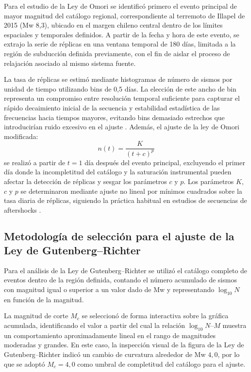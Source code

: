\documentclass[a4paper,12pt]{article} %
\numberwithin{equation}{section} %
\numberwithin{figure}{section} %
\begin{document}
Para el estudio de la Ley de Omori se identificó primero el evento principal de mayor magnitud del catálogo regional, correspondiente al terremoto de Illapel de 2015 (Mw 8{,}3), ubicado en el margen chileno central dentro de los límites espaciales y temporales definidos. A partir de la fecha y hora de este evento, se extrajo la serie de réplicas en una ventana temporal de 180 días, limitada a la región de subducción definida previamente, con el fin de aislar el proceso de relajación asociado al mismo sistema fuente.

La tasa de réplicas se estimó mediante histogramas de número de sismos por unidad de tiempo utilizando bins de 0{,}5 días. La elección de este ancho de bin representa un compromiso entre resolución temporal suficiente para capturar el rápido decaimiento inicial de la secuencia y estabilidad estadística de las frecuencias hacia tiempos mayores, evitando bins demasiado estrechos que introducirían ruido excesivo en el ajuste \cite{peng_2007,utsu_1995}. Además, el ajuste de la ley de Omori modificada:
\[
n(t) = \frac{K}{(t + c)^{p}}
\]
se realizó a partir de $t = 1$ día después del evento principal, excluyendo el primer día donde la incompletitud del catálogo y la saturación instrumental pueden afectar la detección de réplicas y sesgar los parámetros $c$ y $p$. Los parámetros $K$, $c$ y $p$ se determinaron mediante ajuste no lineal por mínimos cuadrados sobre la tasa diaria de réplicas, siguiendo la práctica habitual en estudios de secuencias de aftershocks \cite{utsu_1995,peng_2007}.

\subsection{Metodología de selección para el ajuste de la Ley de Gutenberg--Richter}

Para el análisis de la Ley de Gutenberg--Richter se utilizó el catálogo completo de eventos dentro de la región definida, contando el número acumulado de sismos con magnitud igual o superior a un valor dado de Mw y representando $\log_{10} N$ en función de la magnitud.

La magnitud de corte $M_c$ se seleccionó de forma interactiva sobre la gráfica acumulada, identificando el valor a partir del cual la relación $\log_{10} N$--$M$ muestra un comportamiento aproximadamente lineal en el rango de magnitudes moderadas y grandes. En este caso, la inspección visual de la figura de la Ley de Gutenberg--Richter indicó un cambio de curvatura alrededor de Mw $4{,}0$, por lo que se adoptó $M_c = 4{,}0$ como umbral de completitud del catálogo para el ajuste.
\end{document}
